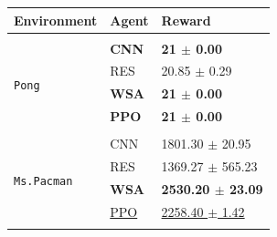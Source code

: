 \begin{table}[ht]
\begin{minipage}[b]{0.49\linewidth}
\centering
    \begin{tabular}[b]{lll}
                \multicolumn{1}{l}{Environment}  &\multicolumn{1}{l}{\bf Agent} &\multicolumn{1}{l}{\bf Reward} \\
                \hline \\
                \multirow{5}{*}{\texttt{Pong}} & \textbf{CNN} & \textbf{21 $\pm$ 0.00} \\
                                      & RES & 20.85 $\pm$ 0.29 \\
                                      & \textbf{WSA} & \textbf{21 $\pm$ 0.00} \\
                                      & \textbf{PPO} & \textbf{21 $\pm$ 0.00}\\

                                      \hline \\
                \multirow{5}{*}{\texttt{Ms.Pacman}} & CNN & 1801.30 $\pm$ 20.95 \\
                                      & RES & 1369.27 $\pm$ 565.23 \\
                                      &\textbf{WSA} & \textbf{2530.20 $\pm$ 23.09} \\
                                      & \underline{PPO} & \underline{2258.40 $\pm$ 1.42}\\
                                      \hline \\


\end{tabular}
\end{minipage}
\end{table}
